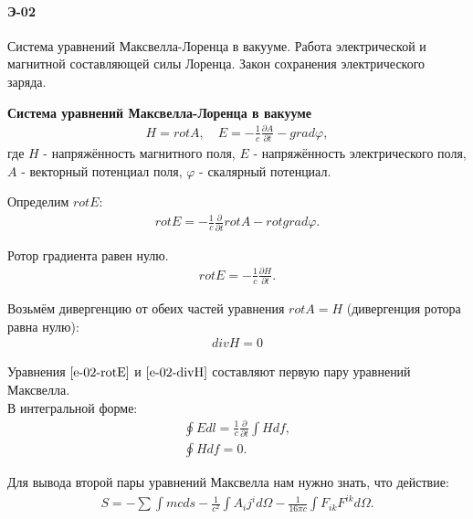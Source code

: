 


\paragraph{Э-02}
Система уравнений Максвелла-Лоренца в вакууме. Работа электрической и магнитной составляющей силы Лоренца. Закон сохранения электрического заряда.

\textbf{Система уравнений Максвелла-Лоренца в вакууме}\\

\begin{gather*}
	H = rot A, \quad E = -\frac{1}{c}\frac{\partial A}{\partial t} - grad \varphi,
\end{gather*}
где $H$ - напряжённость магнитного поля, $E$ - напряжённость электрического поля,
$A$ - векторный потенциал поля,
$\varphi$ - скалярный потенциал.

Определим $rot E$:
\begin{gather*}
	rot E = -\frac{1}{c}\frac{\partial}{\partial t}rot A - rot grad \varphi.
\end{gather*}

Ротор градиента равен нулю.
\begin{gather}
	\label{e-02-rotE}
	rot E = -\frac{1}{c}\frac{\partial H}{\partial t}.
\end{gather}

Возьмём дивергенцию от обеих частей уравнения $rot A = H$ (дивергенция ротора равна нулю):
\begin{gather}
	\label{e-02-divH}
	div H = 0
\end{gather}

Уравнения $\ref{e-02-rotE}$ и  $\ref{e-02-divH}$ составляют первую пару уравнений Максвелла.\\
В интегральной форме:\\
\begin{gather*}
	\oint Edl = \frac{1}{c}\frac{\partial}{\partial t}\int Hdf,\\
	\oint H df = 0.
\end{gather*}

Для вывода второй пары уравнений Максвелла нам нужно знать, что действие:
\begin{gather}
	\label{e-02-S}
	S = -\sum\int mcds - \frac{1}{c^2}\int A_ij^id\Omega - \frac{1}{16\pi c}\int F_{ik}F^{ik}d\Omega.
\end{gather}


